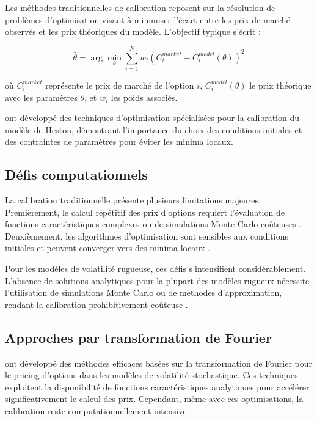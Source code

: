 Les méthodes traditionnelles de calibration reposent sur la résolution de problèmes d'optimisation visant à minimiser l'écart entre les prix de marché observés et les prix théoriques du modèle. L'objectif typique s'écrit :

\begin{equation}
\hat{\theta} = \arg\min_{\theta} \sum_{i=1}^{N} w_i \left(C_i^{market} - C_i^{model}(\theta)\right)^2
\end{equation}

où $C_i^{market}$ représente le prix de marché de l'option $i$, $C_i^{model}(\theta)$ le prix théorique avec les paramètres $\theta$, et $w_i$ les poids associés.

\citet{cui2017full} ont développé des techniques d'optimisation spécialisées pour la calibration du modèle de Heston, démontrant l'importance du choix des conditions initiales et des contraintes de paramètres pour éviter les minima locaux.

\subsection{Défis computationnels}

La calibration traditionnelle présente plusieurs limitations majeures. Premièrement, le calcul répétitif des prix d'options requiert l'évaluation de fonctions caractéristiques complexes ou de simulations Monte Carlo coûteuses \citep{lord2010comparison}. Deuxièmement, les algorithmes d'optimisation sont sensibles aux conditions initiales et peuvent converger vers des minima locaux \citep{mikhailov2003heston}.

Pour les modèles de volatilité rugueuse, ces défis s'intensifient considérablement. L'absence de solutions analytiques pour la plupart des modèles rugueux nécessite l'utilisation de simulations Monte Carlo ou de méthodes d'approximation, rendant la calibration prohibitivement coûteuse \citep{mccrickerd2018turbocharging}.

\subsection{Approches par transformation de Fourier}

\citet{carr1999option} ont développé des méthodes efficaces basées sur la transformation de Fourier pour le pricing d'options dans les modèles de volatilité stochastique. Ces techniques exploitent la disponibilité de fonctions caractéristiques analytiques pour accélérer significativement le calcul des prix. Cependant, même avec ces optimisations, la calibration reste computationnellement intensive.

